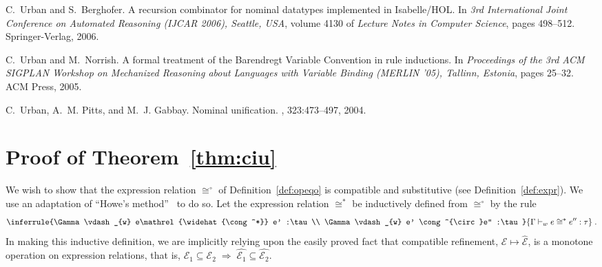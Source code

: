 \documentclass{LMCS}
\theoremstyle{plain}
\theoremstyle{definition}
\newcommand{\CR}[1]{\mathrel{\widehat{#1}}}
\newcommand{\ent}{\vdash}
\newcommand{\er}{\mathrel{\mathcal{E}}}
\renewcommand{\exp}[1][e]{#1}
\newcommand{\imp}{\Rightarrow}
\newcommand{\ofty}{:}
\newcommand{\opeq}{\cong}
\newcommand{\opeqo}{\cong^{\circ}}
\newcommand{\ty}{\tau}
\newcommand{\w}[1][w]{#1}
\begin{document}
\begin{thebibliography}{MTHM97}
C.~Urban and S.~Berghofer.
\newblock A recursion combinator for nominal datatypes implemented in
  {Isabelle/HOL}.
\newblock In {\em 3rd International Joint Conference on Automated Reasoning
  (IJCAR 2006), Seattle, USA}, volume 4130 of {\em Lecture Notes in Computer
  Science}, pages 498--512. Springer-Verlag, 2006.

C.~Urban and M.~Norrish.
\newblock A formal treatment of the {Barendregt} {Variable} {Convention} in
  rule inductions.
\newblock In {\em Proceedings of the 3rd ACM SIGPLAN Workshop on Mechanized
  Reasoning about Languages with Variable Binding (MERLIN '05), Tallinn,
  Estonia}, pages 25--32. ACM Press, 2005.

C.~Urban, A.~M. Pitts, and M.~J. Gabbay.
\newblock Nominal unification.
, 323:473--497, 2004.

\end{thebibliography}


\appendix
\section{Proof of Theorem~\ref{thm:ciu}}
\label{app:proof-ciu-theorem}

We wish to show that the expression relation $\opeqo$ of
Definition~\ref{def:opeqo} is compatible and substitutive (see
Definition~\ref{def:expr}). We use an adaptation of ``Howe's
method''~\cite{HoweDJ:procbf} to do so. Let the expression relation
$\opeq^*$ be inductively defined from $\opeqo$ by the rule
\begin{equation}
  \label{eq:4}
  \inferrule{\Gamma\ent_{\w} \exp \CR{\opeq^*} \exp' \ofty\ty\\
    \Gamma\ent_{\w} \exp' \opeqo \exp'' \ofty \ty
  }{\Gamma\ent_{\w} \exp \opeq^* \exp''\ofty\ty
  }\;.
\end{equation}
In making this inductive definition, we are implicitly relying upon
the easily proved fact that compatible refinement, ${\er}\mapsto
{\CR{\er}}$, is a monotone operation on expression relations,
that is, ${\er_1}\subseteq{\er_2} \;\imp\;
{\CR{\er_1}}\subseteq{\CR{\er_2}}$.
\end{document}
